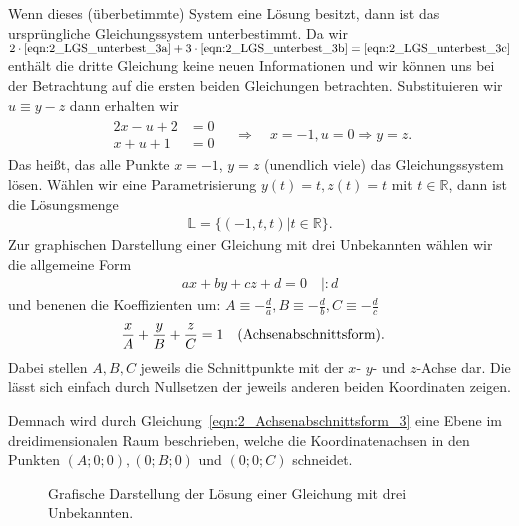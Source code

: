 Wenn dieses (überbetimmte) System eine Lösung besitzt, dann ist das ursprüngliche Gleichungssystem unterbestimmt. Da wir $2\cdot \eqref{eqn:2_LGS_unterbest_3a} + 3 \cdot \eqref{eqn:2_LGS_unterbest_3b} = \eqref{eqn:2_LGS_unterbest_3c}$ enthält die dritte Gleichung keine neuen Informationen und wir können uns bei der Betrachtung auf die ersten beiden Gleichungen betrachten. Substituieren wir $u \equiv y -z$ dann erhalten wir 
\begin{align}
    \begin{split}
        2x -u +2 &= 0\\
        x+ u +1 &= 0
    \end{split} \quad \Rightarrow \quad x=-1, u=0 \Rightarrow y = z.
\end{align}
Das heißt, das alle Punkte $x=-1$, $y=z$ (unendlich viele) das Gleichungssystem lösen. Wählen wir eine Parametrisierung $y(t) = t, z(t) = t$ mit $t\in\mathbb{R}$, dann ist die Lösungsmenge
\begin{align}
    \mathbb{L} = \{(-1,t,t)| t \in \mathbb{R}\}.
\end{align}
Zur graphischen Darstellung einer Gleichung mit drei Unbekannten wählen wir die allgemeine Form 
\begin{align}
    ax + by + cz + d = 0 \quad | :d
\end{align}
und benenen die Koeffizienten um: $A \equiv -\frac{d}{a}, B\equiv -\frac{d}{b}, C \equiv -\frac{d}{c}$
\begin{align}\label{eqn:2_Achsenabschnittsform_3}
    \frac{x}{A} + \frac{y}{B} + \frac{z}{C} = 1 \qq{(Achsenabschnittsform).}
\end{align}
Dabei stellen $A,B,C$ jeweils die Schnittpunkte mit der $x$- $y$- und $z$-Achse dar. Die lässt sich einfach durch Nullsetzen der jeweils anderen beiden Koordinaten zeigen. 

Demnach wird durch Gleichung~\eqref{eqn:2_Achsenabschnittsform_3} eine Ebene im dreidimensionalen Raum beschrieben, welche die Koordinatenachsen in den Punkten $(A;0;0), (0;B;0)$ und $(0;0;C)$ schneidet.

\begin{figure}[htp]
    \centering
    \caption{Grafische Darstellung der Lösung einer Gleichung mit drei Unbekannten.}
\end{figure}

